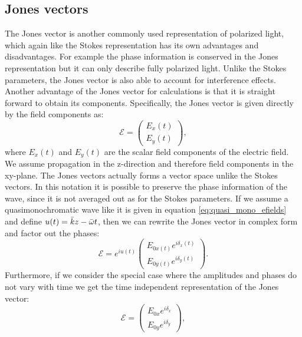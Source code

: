 \subsection{Jones vectors}
\label{sec:jones_vectors}
The Jones vector is another commonly used representation of polarized light, which again like the Stokes representation has its own advantages and disadvantages. For example the phase information is conserved in the Jones representation but it can only describe fully polarized light. Unlike the Stokes parameters, the Jones vector is also able to account for interference effects. Another advantage of the Jones vector for calculations is that it is straight forward to obtain its components. Specifically, the Jones vector is given directly by the field components as:
\begin{equation}
    \label{eq:jones_vector1}
    \bm{\mathcal{E}} = 
    \begin{pmatrix}
    E_x(t) \\
    E_y(t)
    \end{pmatrix},
\end{equation}
where $E_x(t)$ and $E_y(t)$ are the scalar field components of the electric field. We assume propagation in the z-direction and therefore field components in the xy-plane. The Jones vectors actually forms a vector space unlike the Stokes vectors. In this notation it is possible to preserve the phase information of the wave, since it is not averaged out as for the Stokes parameters. If we assume a quasimonochromatic wave like it is given in equation \ref{eq:quasi_mono_efields} and define $u(t)=\Bar{k}z-\Bar{\omega}t$, then we can rewrite the Jones vector in complex form and factor out the phases:
\begin{equation}
    \label{eq:jones_vector2}
    \bm{\mathcal{E}} = e^{iu(t)}
    \begin{pmatrix}
    E_{0x(t)}e^{i\delta_x(t)} \\
    E_{0y(t)}e^{i\delta_y(t)}
    \end{pmatrix}.
\end{equation}
 Furthermore, if we consider the special case where the amplitudes and phases do not vary with time we get the time independent representation of the Jones vector:
 \begin{equation}
    \label{eq:jones_vector3}
    \bm{\mathcal{E}}=
    \begin{pmatrix}
    E_{0x}e^{i\delta_x} \\
    E_{0y}e^{i\delta_y}
    \end{pmatrix},
\end{equation}
